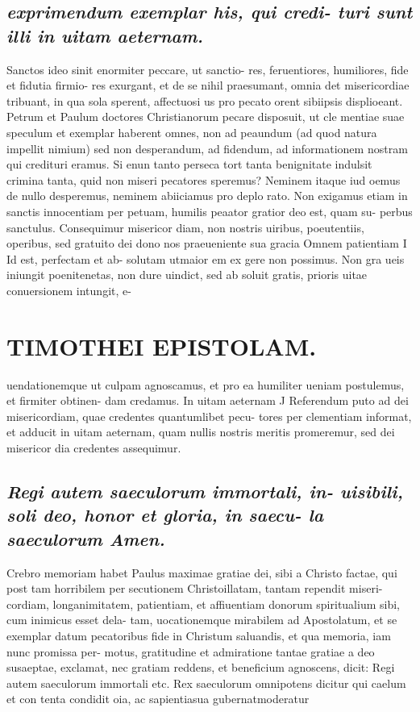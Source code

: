 \documentclass{article}
\begin{document}
\begin{pages}
\subsection*{\textit{exprimendum exemplar his, qui credi- turi sunt illi in uitam aeternam. }}\pstart Sanctos ideo sinit enormiter peccare, ut sanctio- res, feruentiores, humiliores, fide et fidutia firmio- res exurgant, et de se nihil praesumant, omnia det misericordiae tribuant, in qua sola sperent, affectuosi us pro pecato orent sibiipsis displioeant. Petrum et Paulum doctores Christianorum pecare disposuit, ut cle mentiae suae speculum et exemplar haberent omnes, non ad peaundum (ad quod natura impellit nimium) sed non desperandum, ad fidendum, ad informationem nostram qui credituri eramus. Si enun tanto perseca tort tanta benignitate indulsit crimina tanta, quid non miseri pecatores speremus? Neminem itaque iud oemus de nullo desperemus, neminem abiiciamus pro deplo rato. Non exigamus etiam in sanctis innocentiam per petuam, humilis peaator gratior deo est, quam su- perbus sanctulus.  \pend\pstart Consequimur misericor diam, non nostris uiribus, poeutentiis, operibus, sed gratuito dei dono nos praeueniente sua gracia  \pend\pstart Omnem patientiam I Id est, perfectam et ab- solutam utmaior em ex gere non possimus. Non gra ueis iniungit poenitenetas, non dure uindict, sed ab soluit gratis, prioris uitae conuersionem intungit, e-  \pend
\section*{TIMOTHEI EPISTOLAM. }
\marginpar{[ p.35 ]}\pstart uendationemque ut culpam agnoscamus, et pro ea humiliter ueniam postulemus, et firmiter obtinen- dam credamus.  \pend\pstart In uitam aeternam J Referendum puto ad dei misericordiam, quae credentes quantumlibet pecu- tores per clementiam informat, et adducit in uitam aeternam, quam nullis nostris meritis promeremur, sed dei misericor dia credentes assequimur.  \pend
{}
{}
\subsection*{\textit{Regi autem saeculorum immortali, in- uisibili, soli deo, honor et gloria, in saecu- la saeculorum Amen. }}\pstart Crebro memoriam habet Paulus maximae gratiae dei, sibi a Christo factae, qui post tam horribilem per secutionem Christoillatam, tantam rependit miseri- cordiam, longanimitatem, patientiam, et affiuentiam donorum spiritualium sibi, cum inimicus esset dela- tam, uocationemque mirabilem ad Apostolatum, et se exemplar datum pecatoribus fide in Christum saluandis, et qua memoria, iam nunc promissa per- motus, gratitudine et admiratione tantae gratiae a deo susaeptae, exclamat, nec gratiam reddens, et beneficium agnoscens, dicit: Regi autem saeculorum immortali etc.  \pend\pstart Rex saeculorum omnipotens dicitur qui caelum et con tenta condidit oia, ac sapientiasua gubernatmoderatur  \pend

\end{pages}
\end{document}
